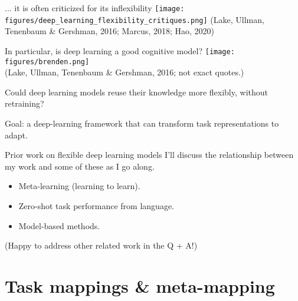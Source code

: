 \documentclass{beamer}
\begin{document}
\begin{frame}{... it is often criticized for its inflexibility}
\texttt{[image: figures/deep\_learning\_flexibility\_critiques.png]}
{\scriptsize (Lake, Ullman, Tenenbaum \& Gershman, 2016; Marcus, 2018; Hao, 2020)}
\end{frame}

\begin{frame}{In particular, is deep learning a good cognitive model?}
\phantom{}
{
\centering
\texttt{[image: figures/brenden.png]}\\
}
{\scriptsize (Lake, Ullman, Tenenbaum \& Gershman, 2016; not exact quotes.)}
\end{frame}

\begin{frame}[standout]
Could deep learning models reuse their knowledge more flexibly, without retraining?
\end{frame}


\begin{frame}[standout]
Goal: a deep-learning framework that can transform task representations to adapt.
\end{frame}

\begin{frame}{Prior work on flexible deep learning models}
I'll discuss the relationship between my work and some of these as I go along.
\begin{itemize}
    \item Meta-learning (learning to learn).
    \item Zero-shot task performance from language.
    \item Model-based methods. 
\end{itemize}
(Happy to address other related work in the Q + A!)
\end{frame}

\section{Task mappings \& meta-mapping}
\end{document}
